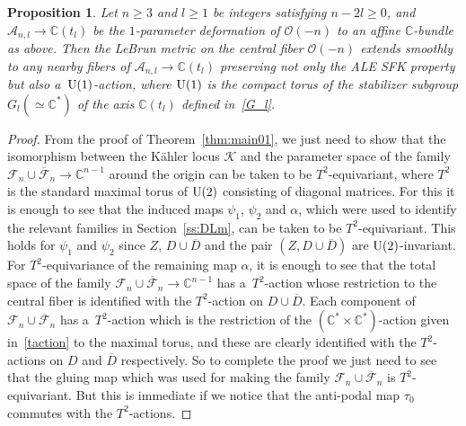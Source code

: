 \documentclass[pdftex]{sigma}
\numberwithin{equation}{section}
\newtheorem{Proposition}[Theorem]{Proposition}
{\theoremstyle{definition}
\newtheorem{Definition}[Theorem]{Definition}
\newtheorem{Remark}[Theorem]{Remark}
}
\begin{document}
\begin{Proposition}
\label{prop:invm}
Let $n\ge 3$ and $l\ge 1$ be integers satisfying $n-2l\ge 0$, and $\mathscr A_{n,l} \to\mathbb{C}(t_l)$ be the
$1$-parameter deformation of $\mathscr O(-n)$ to an affine $\mathbb{C}$-bundle as above.
Then the LeBrun metric on the central fiber $\mathscr O(-n)$ extends smoothly to any nearby fibers of $\mathscr
A_{n,l}\to\mathbb{C}(t_l)$ preserving not only the ALE SFK property but also a~${\rm{U}}(1)$-action, where ${\rm{U}}(1)$
is the compact torus of the stabilizer subgroup $G_l(\simeq\mathbb{C}^*)$ of the axis $\mathbb{C}(t_l)$ defined in~\eqref{G_l}.
\end{Proposition}

\begin{proof}
From the proof of Theorem~\ref{thm:main01}, we just need to show that the isomorphism between the K\"ahler locus
$\mathscr K$ and the parameter space of the family $\mathscr F_n\cup \overline{\mathscr F}_n\to\mathbb{C}^{n-1}$ around
the origin can be taken to be $T^2$-equivariant, where $T^2$ is the standard maximal torus of ${\rm{U}}(2)$ consisting
of diagonal matrices.
For this it is enough to see that the induced maps $\psi_1$, $\psi_2$ and $\alpha$, which were used to identify the
relevant families in Section~\ref{ss:DLm}, can be taken to be $T^2$-equivariant.
This holds for $\psi_1$ and $\psi_2$ since $Z$, $D\cup\overline D$ and the pair $(Z,D\cup\overline D)$ are
${\rm{U}}(2)$-invariant.
For $T^2$-equivariance of the remaining map $\alpha$, it is enough to see that the total space of the family $\mathscr
F_n\cup\overline{\mathscr F}_n\to\mathbb{C}^{n-1}$ has a~$T^2$-action whose restriction to the central f\/iber is
identif\/ied with the $T^2$-action on $D\cup\overline D$.
Each component of $\mathscr F_n\cup\overline{\mathscr F}_n$ has a~$T^2$-action which is the restriction of the
$(\mathbb{C}^*\times\mathbb{C}^*)$-action given in~\eqref{taction} to the maximal torus, and these are clearly
identif\/ied with the $T^2$-actions on $D$ and $\overline D$ respectively.
So to complete the proof we just need to see that the gluing map which was used for making the family $\mathscr
F_n\cup\overline{\mathscr F}_n$ is $T^2$-equivariant.
But this is immediate if we notice that the anti-podal map $\tau_0$ commutes with the $T^2$-actions.
\end{proof}
\end{document}
